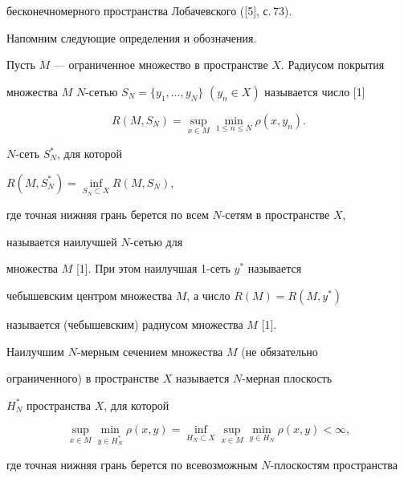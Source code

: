 бесконечномерного пространства Лобачевского ([5], с.\,73). 





Напомним следующие определения и обозначения.





Пусть $M$ --- ограниченное множество в пространстве $X$. Радиусом покрытия


множества $M$\; $N$-сетью $S_{N} = \{y_{1}, \dotsc ,y_{N}\}$ $(y_{n}


\in X)$ называется число [1]


$$


R(M,S_{N}) = \sup\limits_{x\in


M}{\min\limits_{1 \leq n \leq N}{\rho (x,y_{n})}}.


$$





$N$-сеть $ S^{*}_{N}$, для которой


$R(M,S^{*}_{N}) =


\inf\limits_{S_{N} \subset X}{R(M,S_{N})}$,


где точная нижняя грань берется по всем $N$-сетям в пространстве $X$,


называется наилучшей $N$-сетью для


множества $M$ [1]. При этом наилучшая 1-сеть $y^{*}$ называется 


чебышевским центром множества $M$, а число $R(M) = R(M,y^{*})$


называется (чебышевским) радиусом множества $M$ [1].





Наилучшим $N$-мерным сечением множества $M$ (не обязательно


ограниченного) в пространстве $X$ называется $N$-мерная плоскость


$H^{*}_{N}$ пространства $X$, для которой 


\begin{equation}


\sup\limits_{x \in M}{\min\limits_{y \in H^{*}_{N}}{\rho(x,y)}}


= \inf\limits_{H_{N} \subset X}{\sup\limits_{x \in M}{\min\limits_{y \in


H_{N}}{\rho(x,y)}}} < \infty,


\end{equation}


где точная нижняя грань берется по всевозможным $N$-плоскостям пространства


